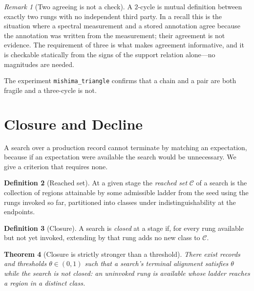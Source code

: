 \documentclass[11pt,twocolumn,a4paper]{article}
\newtheorem{theorem}{Theorem}[section]
\theoremstyle{definition}
\newtheorem{definition}[theorem]{Definition}
\theoremstyle{remark}
\newtheorem{remark}[theorem]{Remark}
\newcommand{\Reached}{\mathcal{C}}
\begin{document}
\begin{remark}[Two agreeing is not a check]
\label{rem:two-agree}
A $2$-cycle is mutual definition between exactly two rungs with no independent
third party. In a recall this is the situation where a spectral measurement and a
stored annotation agree because the annotation was written from the measurement;
their agreement is not evidence. The requirement of three is what makes agreement
informative, and it is checkable statically from the signs of the support
relation alone---no magnitudes are needed.
\end{remark}

The experiment \texttt{mishima\_triangle} confirms that a chain and a pair are
both fragile and a three-cycle is not.

\section{Closure and Decline}
\label{sec:closure}

A search over a production record cannot terminate by matching an expectation,
because if an expectation were available the search would be unnecessary. We give
a criterion that requires none.

\begin{definition}[Reached set]
\label{def:reached}
At a given stage the \emph{reached set} $\Reached$ of a search is the collection
of regions attainable by some admissible ladder from the seed using the rungs
invoked so far, partitioned into classes under indistinguishability at the
endpoints.
\end{definition}

\begin{definition}[Closure]
\label{def:closure}
A search is \emph{closed} at a stage if, for every rung available but not yet
invoked, extending by that rung adds no new class to $\Reached$.
\end{definition}

\begin{theorem}[Closure is strictly stronger than a threshold]
\label{thm:closure-stronger}
There exist records and thresholds $\theta\in(0,1)$ such that a search's terminal
alignment satisfies $\theta$ while the search is not closed: an uninvoked rung is
available whose ladder reaches a region in a distinct class.
\end{theorem}
\end{document}
